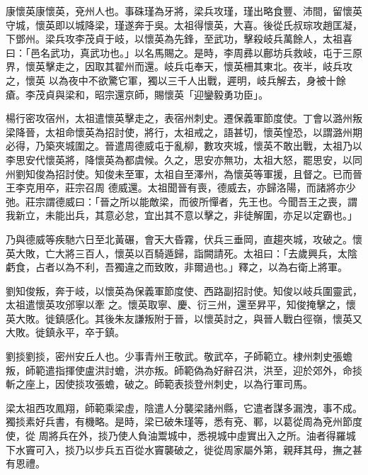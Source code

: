 
\begin{pinyinscope}

 康懷英康懷英，兗州人也。事硃瑾為牙將，梁兵攻瑾，瑾出略食豐、沛間，留懷英守城，懷英即以城降梁，瑾遂奔于吳。太祖得懷英，大喜。後從氏叔琮攻趙匡凝，下鄧州。梁兵攻李茂貞于岐，以懷英為先鋒，至武功，擊殺岐兵萬餘人，太祖喜曰：「邑名武功，真武功也。」以名馬賜之。是時，李周彞以鄜坊兵救岐，屯于三原界，懷英擊走之，因取其翟州而還。岐兵屯奉天，懷英柵其東北。夜半，岐兵攻之，懷英
 以為夜中不欲驚它軍，獨以三千人出戰，遲明，岐兵解去，身被十餘瘡。李茂貞與梁和，昭宗還京師，賜懷英「迎鑾毅勇功臣」。



 楊行密攻宿州，太祖遣懷英擊走之，表宿州刺史。遷保義軍節度使。丁會以潞州叛梁降晉，太祖命懷英為招討使，將行，太祖戒之，語甚切，懷英惶恐，以謂潞州期必得，乃築夾城圍之。晉遣周德威屯于亂柳，數攻夾城，懷英不敢出戰，太祖乃以李思安代懷英將，降懷英為都虞候。久之，思安亦無功，太祖大怒，罷思安，以同州劉知俊為招討使。知俊未至軍，太祖自至澤州，為懷英等軍援，且督之。已而晉王李克用卒，莊宗召周
 德威還。太祖聞晉有喪，德威去，亦歸洛陽，而諸將亦少弛。莊宗謂德威曰：「晉之所以能敵梁，而彼所憚者，先王也。今聞吾王之喪，謂我新立，未能出兵，其意必怠，宜出其不意以擊之，非徒解圍，亦足以定霸也。」



 乃與德威等疾馳六日至北黃碾，會天大昏霧，伏兵三垂岡，直趨夾城，攻破之。懷英大敗，亡大將三百人，懷英以百騎遁歸，詣闕請死。太祖曰：「去歲興兵，太陰虧食，占者以為不利，吾獨違之而致敗，非爾過也。」釋之，以為右衛上將軍。



 劉知俊叛，奔于岐，以懷英為保義軍節度使、西路副招討使。知俊以岐兵圍靈武，太祖遣懷英攻邠寧以牽
 之。懷英取寧、慶、衍三州，還至昇平，知俊掩擊之，懷英大敗。徙鎮感化。其後朱友謙叛附于晉，以懷英討之，與晉人戰白徑嶺，懷英又大敗。徙鎮永平，卒于鎮。



 劉掞劉掞，密州安丘人也。少事青州王敬武。敬武卒，子師範立。棣州刺史張蟾叛，師範遣指揮使盧洪討蟾，洪亦叛。師範偽為好辭召洪，洪至，迎於郊外，命掞斬之座上，因使掞攻張蟾，破之。師範表掞登州刺史，以為行軍司馬。



 梁太祖西攻鳳翔，師範乘梁虛，陰遣人分襲梁諸州縣，它遣者謀多漏洩，事不成。獨掞素好兵書，有機略。是時，梁已破朱瑾等，悉有兗、鄆，以葛從周為兗州節度使，從
 周將兵在外，掞乃使人負油鬻城中，悉視城中虛實出入之所。油者得羅城下水竇可入，掞乃以步兵五百從水竇襲破之，徙從周家屬外第，親拜其母，撫之甚有恩禮。




\end{pinyinscope}
